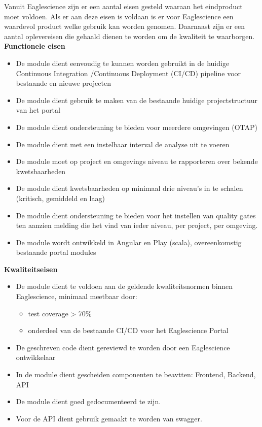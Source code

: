 Vanuit Eaglescience zijn er een aantal eisen gesteld waaraan het eindproduct moet voldoen. Als er aan deze eisen is voldaan is er voor Eaglescience een waardevol product welke gebruik kan worden genomen. Daarnaast zijn er een aantal oplevereisen die gehaald dienen te worden om de kwaliteit te waarborgen. \\

\textbf{Functionele eisen}
\begin{itemize}
\item De module dient eenvoudig te kunnen worden gebruikt in de huidige Continuous Integration /Continuous Deployment (CI/CD) pipeline voor bestaande en nieuwe projecten
\item De module dient gebruik te maken van de bestaande huidige projectstructuur van het portal
\item De module dient ondersteuning te bieden voor meerdere omgevingen (OTAP)
\item De module dient met een instelbaar interval de analyse uit te voeren
\item De module moet op project en omgevings niveau te rapporteren over bekende kwetsbaarheden
\item De module dient kwetsbaarheden op minimaal drie niveau’s in te schalen (kritisch, gemiddeld en laag)
\item De module dient ondersteuning te bieden voor het instellen van quality gates ten aanzien melding die het vind van ieder niveau, per project, per omgeving.
\item De module wordt ontwikkeld in Angular en Play (scala), overeenkomstig bestaande portal modules
\end{itemize}
\textbf{Kwaliteitseisen}
\begin{itemize}
\item De module dient te voldoen aan de geldende kwaliteitsnormen binnen Eaglescience, minimaal meetbaar door:
	\begin{itemize}
	\item test coverage > 70\%
	\item onderdeel van de bestaande CI/CD voor het Eaglescience Portal
	\end{itemize}
\item De geschreven code dient gereviewd te worden door een Eaglescience ontwikkelaar
\item In de module dient gescheiden componenten te beavtten: Frontend, Backend, API
\item De module dient goed gedocumenteerd te zijn.
\item Voor de API dient gebruik gemaakt te worden van swagger.
\end{itemize}

